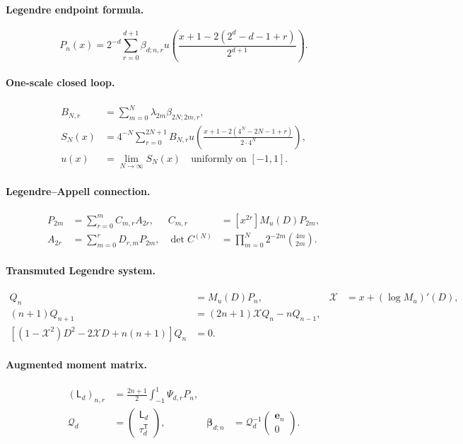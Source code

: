 \documentclass[11pt,oneside]{article}
\theoremstyle{definition}
\theoremstyle{remark}
\newcommand{\cX}{\mathcal X}
\newcommand{\cQ}{\mathcal Q}
\begin{document}
\paragraph{Legendre endpoint formula.}
\[
 P_n(x)=2^{-d}\sum_{r=0}^{d+1}\beta_{d;n,r}
 u\!\left(\frac{x+1-2(2^d-d-1+r)}{2^{d+1}}\right).
\]

\paragraph{One-scale closed loop.}
\begin{align*}
 B_{N,r}&=\sum_{m=0}^N\lambda_{2m}\beta_{2N;2m,r},\\
 S_N(x)&=4^{-N}\sum_{r=0}^{2N+1}B_{N,r}
 u\!\left(\frac{x+1-2(4^N-2N-1+r)}{2\cdot4^N}\right),\\
 u(x)&=\lim_{N\to\infty}S_N(x)\quad\text{uniformly on }[-1,1].
\end{align*}

\paragraph{Legendre--Appell connection.}
\begin{align*}
 P_{2m}&=\sum_{r=0}^mC_{m,r}A_{2r},
 &C_{m,r}&=[x^{2r}]M_u(D)P_{2m},\\
 A_{2r}&=\sum_{m=0}^rD_{r,m}P_{2m},
 &\det C^{(N)}&=\prod_{m=0}^N2^{-2m}\binom{4m}{2m}.
\end{align*}

\paragraph{Transmuted Legendre system.}
\begin{align*}
 Q_n&=M_u(D)P_n,&\cX&=x+(\log M_u)'(D),\\
 (n+1)Q_{n+1}&=(2n+1)\cX Q_n-nQ_{n-1},\\
 [(1-\cX^2)D^2-2\cX D+n(n+1)]Q_n&=0.
\end{align*}

\paragraph{Augmented moment matrix.}
\begin{align*}
 (\mathsf L_d)_{n,r}&=\frac{2n+1}{2}\int_{-1}^{1}\Psi_{d,r}P_n,\\
 \cQ_d&=\begin{pmatrix}\mathsf L_d\\ \tau_d^{\mathsf T}\end{pmatrix},
 &\bm\beta_{d;n}&=\cQ_d^{-1}\begin{pmatrix}\bm e_n\\0\end{pmatrix}.
\end{align*}
\end{document}
